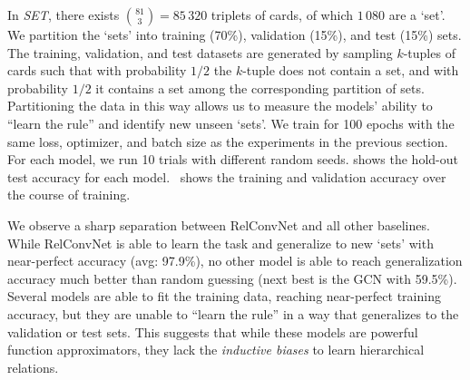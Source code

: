 
In \textit{SET}, there exists $\binom{81}{3} = 85\,320$ triplets of cards, of which $1\,080$ are a `set'. We partition the `sets' into training (70\%), validation (15\%), and test (15\%) sets. The training, validation, and test datasets are generated by sampling $k$-tuples of cards such that with probability $1/2$ the $k$-tuple does not contain a set, and with probability $1/2$ it contains a set among the corresponding partition of sets. Partitioning the data in this way allows us to measure the models' ability to ``learn the rule'' and identify new unseen `sets'.
We train for 100 epochs with the same loss, optimizer, and batch size as the experiments in the previous section. For each model, we run 10 trials with different random seeds.
 shows the hold-out test accuracy for each model.~ shows the training and validation accuracy over the course of training.

We observe a sharp separation between RelConvNet and all other baselines. While RelConvNet is able to learn the task and generalize to new `sets' with near-perfect accuracy (avg: 97.9\%), no other model is able to reach generalization accuracy much better than random guessing (next best is the GCN with 59.5\%). Several models are able to fit the training data, reaching near-perfect training accuracy, but they are unable to ``learn the rule'' in a way that generalizes to the validation or test sets. This suggests that while these models are powerful function approximators, they lack the \textit{inductive biases} to learn hierarchical relations.

